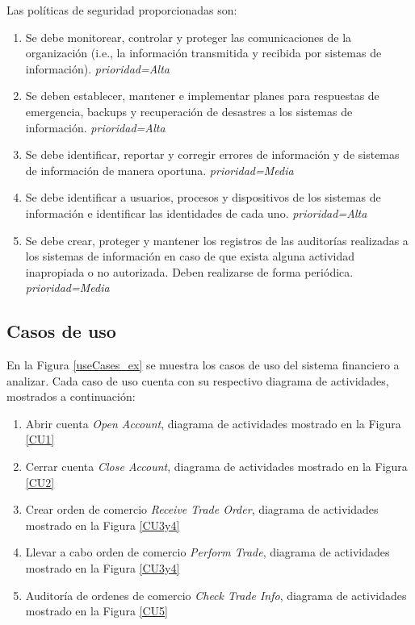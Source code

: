 Las políticas de seguridad proporcionadas son:
\begin{enumerate}[label=Pol$_{\arabic*}$:,leftmargin=*,noitemsep]
	\item Se debe monitorear, controlar y proteger las comunicaciones de la organización (i.e., la información transmitida y recibida por sistemas de información). \textit{prioridad=Alta}
	\item Se deben establecer, mantener e implementar planes para respuestas de emergencia, backups y recuperación de desastres a los sistemas de información. \textit{prioridad=Alta}
	\item Se debe identificar, reportar y corregir errores de información y de sistemas de información de manera oportuna. \textit{prioridad=Media}
	\item Se debe identificar a usuarios, procesos y dispositivos de los sistemas de información e identificar las identidades de cada uno. \textit{prioridad=Alta}
	\item Se debe crear, proteger y mantener los registros de las auditorías realizadas a los sistemas de información en caso de que exista alguna actividad inapropiada o no autorizada. Deben realizarse de forma periódica. \textit{prioridad=Media}
\end{enumerate}

\subsection{Casos de uso}

En la Figura \ref{useCases_ex} se muestra los casos de uso del sistema financiero a analizar. Cada caso de uso cuenta con su respectivo diagrama de actividades, mostrados a continuación:

\begin{enumerate}[noitemsep,label=CU$_{\arabic*}$:,leftmargin=*]
	\item Abrir cuenta \textit{Open Account}, diagrama de actividades mostrado en la Figura \ref{CU1}
	\item Cerrar cuenta \textit{Close Account}, diagrama de actividades mostrado en la Figura \ref{CU2}
	\item Crear orden de comercio \textit{Receive Trade Order}, diagrama de actividades mostrado en la Figura \ref{CU3y4}
	\item Llevar a cabo orden de comercio \textit{Perform Trade}, diagrama de actividades mostrado en la Figura \ref{CU3y4}
	\item Auditoría de ordenes de comercio \textit{Check Trade Info}, diagrama de actividades mostrado en la Figura \ref{CU5}
\end{enumerate}


